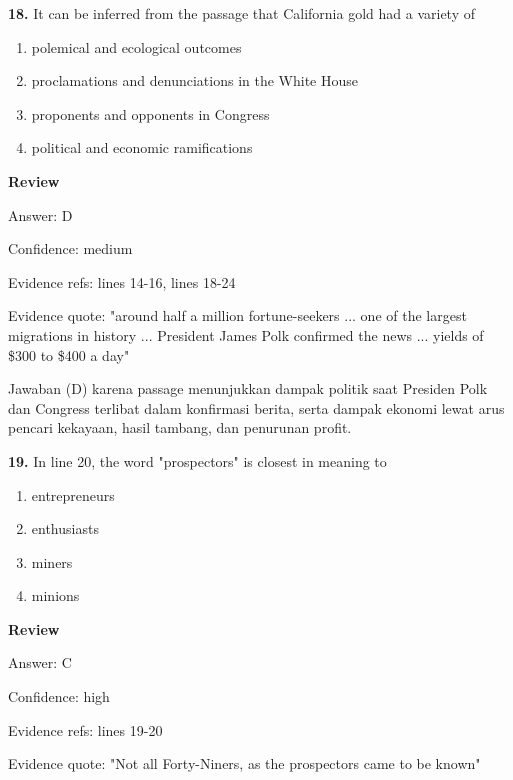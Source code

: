 \documentclass[12pt]{article}
\begin{document}
\endgroup
\par
\vspace{0.25\baselineskip}
\noindent\textbf{18.} It can be inferred from the passage that California gold had a variety of
\begin{enumerate}[label=(\Alph*),leftmargin=*,itemsep=0.2em]
\item polemical and ecological outcomes
\item proclamations and denunciations in the White House
\item proponents and opponents in Congress
\item political and economic ramifications
\end{enumerate}
\par
\begingroup
\setlength{\parskip}{0pt}
\setlength{\parindent}{0pt}
\textbf{Review}\par
Answer: D\par
Confidence: medium\par
Evidence refs: lines 14-16, lines 18-24\par
Evidence quote: "around half a million fortune-seekers ... one of the largest migrations in history ... President James Polk confirmed the news ... yields of \$300 to \$400 a day"\par
Jawaban (D) karena passage menunjukkan dampak politik saat Presiden Polk dan Congress terlibat dalam konfirmasi berita, serta dampak ekonomi lewat arus pencari kekayaan, hasil tambang, dan penurunan profit.\par
\endgroup
\par
\vspace{0.25\baselineskip}
\noindent\textbf{19.} In line 20, the word "prospectors" is closest in meaning to
\begin{enumerate}[label=(\Alph*),leftmargin=*,itemsep=0.2em]
\item entrepreneurs
\item enthusiasts
\item miners
\item minions
\end{enumerate}
\par
\begingroup
\setlength{\parskip}{0pt}
\setlength{\parindent}{0pt}
\textbf{Review}\par
Answer: C\par
Confidence: high\par
Evidence refs: lines 19-20\par
Evidence quote: "Not all Forty-Niners, as the prospectors came to be known"\par
\end{document}
